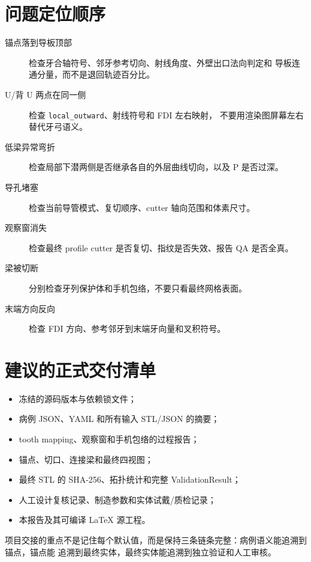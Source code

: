 \section{问题定位顺序}

\begin{description}
  \item[锚点落到导板顶部] 检查牙合轴符号、邻牙参考切向、射线角度、外壁出口法向判定和
  导板连通分量，而不是退回轨迹百分比。
  \item[U/背 U 两点在同一侧] 检查 \texttt{local\_outward}、射线符号和 FDI 左右映射，
  不要用渲染图屏幕左右替代牙弓语义。
  \item[低梁异常弯折] 检查局部下潜两侧是否继承各自的外层曲线切向，以及 P 是否过深。
  \item[导孔堵塞] 检查当前导管模式、复切顺序、cutter 轴向范围和体素尺寸。
  \item[观察窗消失] 检查最终 profile cutter 是否复切、指纹是否失效、报告 QA 是否全真。
  \item[梁被切断] 分别检查牙列保护体和手机包络，不要只看最终网格表面。
  \item[末端方向反向] 检查 FDI 方向、参考邻牙到末端牙向量和叉积符号。
\end{description}

\section{建议的正式交付清单}

\begin{itemize}
  \item 冻结的源码版本与依赖锁文件；
  \item 病例 JSON、YAML 和所有输入 STL/JSON 的摘要；
  \item tooth mapping、观察窗和手机包络的过程报告；
  \item 锚点、切口、连接梁和最终四视图；
  \item 最终 STL 的 SHA-256、拓扑统计和完整 ValidationResult；
  \item 人工设计复核记录、制造参数和实体试戴/质检记录；
  \item 本报告及其可编译 LaTeX 源工程。
\end{itemize}

\begin{takeaway}
项目交接的重点不是记住每个默认值，而是保持三条链条完整：病例语义能追溯到锚点，锚点能
追溯到最终实体，最终实体能追溯到独立验证和人工审核。
\end{takeaway}

